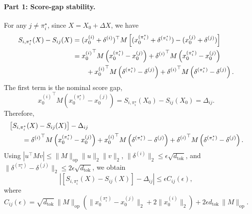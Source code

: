 \documentclass{article}
\theoremstyle{definition}
\begin{document}
\paragraph{Part 1: Score-gap stability.}
For any $j\neq\pi_i^\star$, since $X=X_0+\Delta X$, we have
\begin{align}
    S_{i,\pi_i^\star}(X)-S_{ij}(X)
    &=
    (x_0^{(i)}+\delta^{(i)})^\top M
    \left[
        (x_0^{(\pi_i^\star)}+\delta^{(\pi_i^\star)})
        -
        (x_0^{(j)}+\delta^{(j)})
    \right] \notag\\
    &=
    {x_0^{(i)}}^\top M
    \left(x_0^{(\pi_i^\star)}-x_0^{(j)}\right)
    +
    {\delta^{(i)}}^\top M
    \left(x_0^{(\pi_i^\star)}-x_0^{(j)}\right) \notag\\
    &\qquad
    +
    {x_0^{(i)}}^\top M
    \left(\delta^{(\pi_i^\star)}-\delta^{(j)}\right)
    +
    {\delta^{(i)}}^\top M
    \left(\delta^{(\pi_i^\star)}-\delta^{(j)}\right).
    \label{eq:app_attention_gap_expand_full}
\end{align}
The first term is the nominal score gap,
\[
    {x_0^{(i)}}^\top M
    \left(x_0^{(\pi_i^\star)}-x_0^{(j)}\right)
    =
    S_{i,\pi_i^\star}(X_0)-S_{ij}(X_0)
    =
    \Delta_{ij}.
\]
Therefore,
\begin{align}
    &\left[S_{i,\pi_i^\star}(X)-S_{ij}(X)\right]-\Delta_{ij} \notag\\
    &\qquad =
    {\delta^{(i)}}^\top M
    \left(x_0^{(\pi_i^\star)}-x_0^{(j)}\right)
    +
    {x_0^{(i)}}^\top M
    \left(\delta^{(\pi_i^\star)}-\delta^{(j)}\right)+
    {\delta^{(i)}}^\top M
    \left(\delta^{(\pi_i^\star)}-\delta^{(j)}\right).
    \label{eq:app_attention_gap_expansion}
\end{align}
Using $|u^\top Mv|\leq \|M\|_{\mathrm{op}}\|u\|_2\|v\|_2$, $\|\delta^{(i)}\|_2\leq\epsilon\sqrt{d_{\mathrm{tok}}}$, and $\|\delta^{(\pi_i^\star)}-\delta^{(j)}\|_2\leq 2\epsilon\sqrt{d_{\mathrm{tok}}}$, we obtain
\begin{equation}
    \left|
    \left[S_{i,\pi_i^\star}(X)-S_{ij}(X)\right]-\Delta_{ij}
    \right|
    \leq
    \epsilon C_{ij}(\epsilon),
    \label{eq:app_attention_gap_bound}
\end{equation}
where
\begin{equation}
    C_{ij}(\epsilon)
    =
    \sqrt{d_{\mathrm{tok}}}\,\|M\|_{\mathrm{op}}
    \left(
        \|x_0^{(\pi_i^\star)}-x_0^{(j)}\|_2
        +
        2\|x_0^{(i)}\|_2
    \right)
    +
    2\epsilon d_{\mathrm{tok}}\,\|M\|_{\mathrm{op}}.
    \label{eq:app_attention_Cij}
\end{equation}
\end{document}
